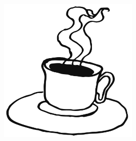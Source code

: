 %

\begin{figure}[!b]
\begin{center}
\includegraphics[width=7cm]{../bilder/fardigabilder/BilderTillKapitel/kaffe.png} 
\end{center}
\end{figure}
\sclearpage

\sclearpage


%
\sclearpage

\sclearpage

\sclearpage

\sclearpage

%
%
\sclearpage

